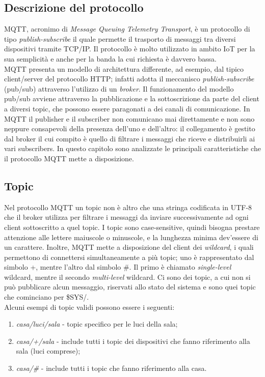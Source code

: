\documentclass[binding=0.6cm,TFA]{sapthesis}
\begin{document}
\begin{large}

\section{Descrizione del protocollo}

MQTT, acronimo di \textit{Message Queuing Telemetry Transport}, è un protocollo di tipo \textit{publish-subscribe} il quale permette il trasporto di messaggi tra diversi dispositivi tramite TCP/IP. Il protocollo è molto utilizzato in ambito IoT per la sua semplicità e anche per la banda la cui richiesta è davvero bassa. \\

MQTT presenta un modello di architettura differente, ad esempio, dal tipico client/server del protocollo HTTP; infatti adotta il meccanisco \textit{publish-subscribe} (pub/sub) attraverso l'utilizzo di un \textit{broker}. Il funzionamento del modello pub/sub avviene attraverso la pubblicazione e la sottoscrizione da parte del client a diversi topic, che possono essere paragonati a dei canali di comunicazione. In MQTT il publisher e il subscriber non comunicano mai direttamente e non sono neppure consapevoli della presenza dell'uno e dell'altro: il collegamento è gestito dal broker il cui compito è quello di filtrare i messaggi che riceve e distribuirli ai vari subscribers. 
In questo capitolo sono analizzate le principali caratteristiche che il protocollo MQTT mette a disposizione.

\subsection{Topic}
Nel protocollo MQTT un topic non è altro che una stringa codificata in UTF-8 che il broker utilizza per filtrare i messaggi da inviare successivamente ad ogni client sottoscritto a quel topic. I topic sono case-sensitive, quindi bisogna prestare attenzione alle lettere maiuscole o minuscole, e la lunghezza minima dev'essere di un carattere. Inoltre, MQTT mette a disposizione del client dei \textit{wildcard}, i quali permettono di connettersi simultaneamente a più topic; uno è rappresentato dal simbolo +, mentre l'altro dal simbolo \#. Il primo è chiamato \textit{single-level} wildcard, mentre il secondo \textit{multi-level} wildcard. Ci sono dei topic, a cui non si può pubblicare alcun messaggio, riservati allo stato del sistema e sono quei topic che cominciano per \$SYS/. \\
Alcuni esempi di topic validi possono essere i seguenti: 
\begin{enumerate}
\item \textit{casa/luci/sala} - topic specifico per le luci della sala;
\item \textit{casa/+/sala} - include tutti i topic dei dispositivi che fanno riferimento alla sala (luci comprese);
\item \textit{casa/\#} - include tutti i topic che fanno riferimento alla casa.
\end{enumerate}



\end{large}
\end{document}
